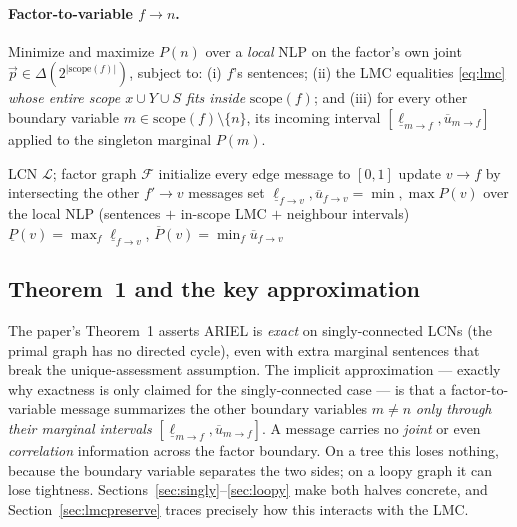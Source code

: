 \documentclass[11pt]{article}
\newcommand{\lo}{\underline}
\newcommand{\hi}{\overline}
\begin{document}
\paragraph{Factor-to-variable $f\!\to\!n$.} Minimize and maximize $P(n)$ over a \emph{local} NLP on
the factor's own joint $\vec p\in\Delta(2^{|\mathrm{scope}(f)|})$, subject to: (i) $f$'s sentences;
(ii) the LMC equalities \eqref{eq:lmc} \emph{whose entire scope $x\cup Y\cup S$ fits inside}
$\mathrm{scope}(f)$; and (iii) for every other boundary variable
$m\in\mathrm{scope}(f)\setminus\{n\}$, its incoming interval $[\lo\ell_{m\to f},\hi u_{m\to f}]$
applied to the singleton marginal $P(m)$.

\begin{algorithm}[t]
\caption{ARIEL (Marinescu et al., IJCAI-2023, Algorithm~1)}\label{alg:ariel}
\begin{algorithmic}[1]
\Require LCN $\mathcal L$; factor graph $\mathcal F$
\State initialize every edge message to $[0,1]$
\Repeat
   update $v\!\to\!f$ by intersecting the other $f'\!\to\!v$ messages
  \EndFor
   set $\lo\ell_{f\to v},\hi u_{f\to v}=\min,\max P(v)$ over the local NLP
    (sentences $+$ in-scope LMC $+$ neighbour intervals)
  \EndFor
{}
 \Return $\lo P(v)=\max_{f}\lo\ell_{f\to v}$, $\hi P(v)=\min_{f}\hi u_{f\to v}$
\EndFor
\end{algorithmic}
\end{algorithm}

\subsection{Theorem~1 and the key approximation}\label{sec:approx}
The paper's Theorem~1 asserts ARIEL is \emph{exact} on singly-connected LCNs (the primal graph has
no directed cycle), even with extra marginal sentences that break the unique-assessment
assumption. The implicit approximation --- exactly why exactness is only claimed for the
singly-connected case --- is that a factor-to-variable message summarizes the other boundary
variables $m\neq n$ \emph{only through their marginal intervals} $[\lo\ell_{m\to f},\hi u_{m\to f}]$.
A message carries no \emph{joint} or even \emph{correlation} information across the factor boundary.
On a tree this loses nothing, because the boundary variable separates the two sides; on a loopy
graph it can lose tightness. Sections~\ref{sec:singly}--\ref{sec:loopy} make both halves concrete,
and Section~\ref{sec:lmcpreserve} traces precisely how this interacts with the LMC.
\end{document}
